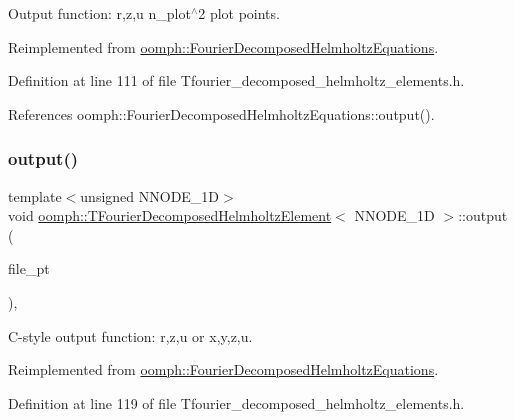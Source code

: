 Output function\+: r,z,u n\+\_\+plot$^\wedge$2 plot points. 



Reimplemented from \hyperlink{classoomph_1_1FourierDecomposedHelmholtzEquations_a19e2628564b587b97db37c9a4820be60}{oomph\+::\+Fourier\+Decomposed\+Helmholtz\+Equations}.



Definition at line 111 of file Tfourier\+\_\+decomposed\+\_\+helmholtz\+\_\+elements.\+h.



References oomph\+::\+Fourier\+Decomposed\+Helmholtz\+Equations\+::output().

\mbox{\label{classoomph_1_1TFourierDecomposedHelmholtzElement_a5ff9eff472598398a2f31c30ff478e7d}} 
\subsubsection{\texorpdfstring{output()}{output()}\hspace{0.1cm}{\footnotesize\ttfamily [3/4]}}
{\footnotesize\ttfamily template$<$unsigned N\+N\+O\+D\+E\+\_\+1D$>$ \\
void \hyperlink{classoomph_1_1TFourierDecomposedHelmholtzElement}{oomph\+::\+T\+Fourier\+Decomposed\+Helmholtz\+Element}$<$ N\+N\+O\+D\+E\+\_\+1D $>$\+::output (\begin{DoxyParamCaption}\item[{F\+I\+LE $\ast$}]{file\+\_\+pt }\end{DoxyParamCaption})\hspace{0.3cm}{\ttfamily [inline]}, {\ttfamily [virtual]}}



C-\/style output function\+: r,z,u or x,y,z,u. 



Reimplemented from \hyperlink{classoomph_1_1FourierDecomposedHelmholtzEquations_af4d25af42bb3ccacd49e12b93bb38953}{oomph\+::\+Fourier\+Decomposed\+Helmholtz\+Equations}.



Definition at line 119 of file Tfourier\+\_\+decomposed\+\_\+helmholtz\+\_\+elements.\+h.



